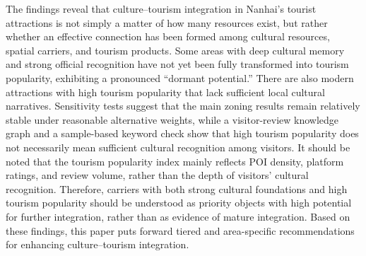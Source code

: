 \begin{abstract*}
The findings reveal that culture--tourism integration in Nanhai's tourist attractions is not simply a matter of how many resources exist, but rather whether an effective connection has been formed among cultural resources, spatial carriers, and tourism products. Some areas with deep cultural memory and strong official recognition have not yet been fully transformed into tourism popularity, exhibiting a pronounced ``dormant potential.'' There are also modern attractions with high tourism popularity that lack sufficient local cultural narratives. Sensitivity tests suggest that the main zoning results remain relatively stable under reasonable alternative weights, while a visitor-review knowledge graph and a sample-based keyword check show that high tourism popularity does not necessarily mean sufficient cultural recognition among visitors. It should be noted that the tourism popularity index mainly reflects POI density, platform ratings, and review volume, rather than the depth of visitors' cultural recognition. Therefore, carriers with both strong cultural foundations and high tourism popularity should be understood as priority objects with high potential for further integration, rather than as evidence of mature integration. Based on these findings, this paper puts forward tiered and area-specific recommendations for enhancing culture--tourism integration.

\end{abstract*}
